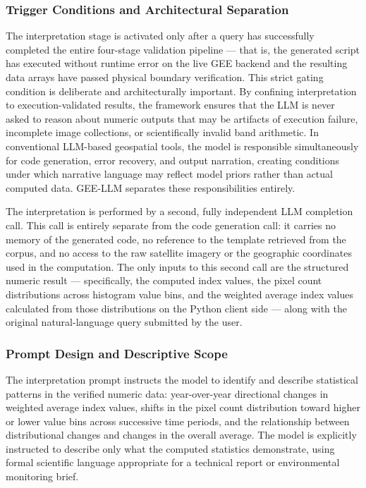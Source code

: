 \documentclass[pdflatex,sn-mathphys-ay]{sn-jnl}
\begin{document}
\subsubsection{Trigger Conditions and Architectural Separation}

The interpretation stage is activated only after a query has successfully completed the entire four-stage validation pipeline --- that is, the generated script has executed without runtime error on the live GEE backend and the resulting data arrays have passed physical boundary verification. This strict gating condition is deliberate and architecturally important. By confining interpretation to execution-validated results, the framework ensures that the LLM is never asked to reason about numeric outputs that may be artifacts of execution failure, incomplete image collections, or scientifically invalid band arithmetic. In conventional LLM-based geospatial tools, the model is responsible simultaneously for code generation, error recovery, and output narration, creating conditions under which narrative language may reflect model priors rather than actual computed data. GEE-LLM separates these responsibilities entirely.

The interpretation is performed by a second, fully independent LLM completion call. This call is entirely separate from the code generation call: it carries no memory of the generated code, no reference to the template retrieved from the corpus, and no access to the raw satellite imagery or the geographic coordinates used in the computation. The only inputs to this second call are the structured numeric result --- specifically, the computed index values, the pixel count distributions across histogram value bins, and the weighted average index values calculated from those distributions on the Python client side --- along with the original natural-language query submitted by the user.

\subsubsection{Prompt Design and Descriptive Scope}

The interpretation prompt instructs the model to identify and describe statistical patterns in the verified numeric data: year-over-year directional changes in weighted average index values, shifts in the pixel count distribution toward higher or lower value bins across successive time periods, and the relationship between distributional changes and changes in the overall average. The model is explicitly instructed to describe only what the computed statistics demonstrate, using formal scientific language appropriate for a technical report or environmental monitoring brief.
\end{document}
